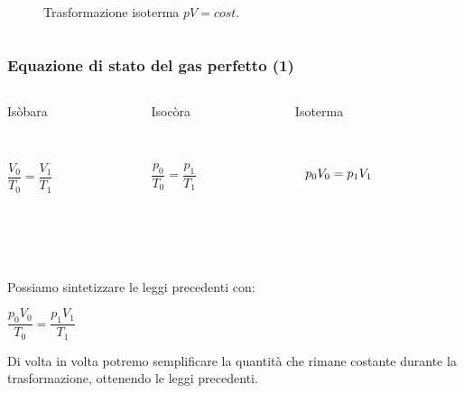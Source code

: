 \documentclass[]{beamer}
\theoremstyle{plain}
\begin{document}
\begin{frame}
\begin{columns}
\begin{column}{0.33\textwidth}
\begin{figure}
{\scriptsize Trasformazione isoterma $ pV = cost. $}
\end{figure}
\end{column}
\end{columns}
















\end{frame}










\begin{frame}
\frametitle{Equazione di stato del gas perfetto (1)}
\begin{columns}
\begin{column}{0.3\textwidth}
\begin{center}
Isòbara

~

$ \dfrac{V_0}{T_0} = \dfrac{V_1}{T_1} $
\end{center}
\end{column}
\begin{column}{0.3\textwidth}
\begin{center}
Isocòra

~

$ \dfrac{p_0}{T_0} = \dfrac{p_1}{T_1} $
\end{center}
\end{column}
\begin{column}{0.3\textwidth}
\begin{center}
Isoterma

~

$ \textcolor{white}{\dfrac{a}{b}}p_0 V_0 = p_1 V_1 \textcolor{white}{\dfrac{a}{b}}$
\end{center}
\end{column}
\end{columns}\pause

~

~

Possiamo sintetizzare le leggi precedenti con:
\begin{center}
\colorbox{marroncino!30}{$ \dfrac{p_0 V_0}{T_0} = \dfrac{p_1 V_1}{T_1} $}
\end{center}\pause
Di volta in volta potremo semplificare la quantità che rimane costante durante la trasformazione, ottenendo le leggi precedenti.
\end{frame}
\end{document}
